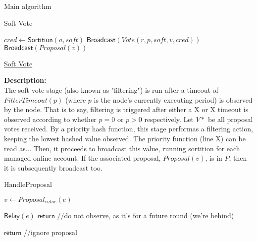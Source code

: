 \documentclass[10pt,a4paper]{article}
\begin{document}
\begin{section}{Main algorithm}
\begin{subsection}{Soft Vote}
\begin{algorithm}[H]
\begin{algorithmic}[1]
            \State $cred \gets \mathsf{Sortition}(a, soft)$
                \State $\mathsf{Broadcast}(Vote(r, p, soft, v, cred))$
                    \State $\mathsf{Broadcast}(Proposal(v))$
                \EndIf
            \EndIf
        \EndFor
    \EndIf

    \EndFunction
    \end{algorithmic}
    \caption{\underline{Soft Vote}}
\end{algorithm}

\noindent \textbf{Description:}\\
The soft vote stage (also known as "filtering") is run after a timeout of $FilterTimeout(p)$
(where $p$ is the node's currently executing period) is observed by the node. That is to say, filtering
is triggered after either a X or X timeout is observed according to whether $p=0$ or $p>0$ respectively.
Let $V*$ be all proposal votes received. By a priority hash function, this stage performas a filtering action,
keeping the lowest hashed value observed.
The priority function (line X) can be read as...
Then, it proceeds to broadcast this value, running sortition for each managed online account.
If the associated proposal, $Proposal(v)$, is in $P$, then it is subsequently broadcast too.

\end{subsection}


\begin{subsection}{HandleProposal}\label{ssect:HandleProposal}

    \begin{algorithm}[H]
        \begin{algorithmic}[1]

            \State $v \gets Proposal_{value}(e)$

                \State $\mathsf{Relay}(e)$
                \State $\mathsf{return}$  //do not observe, as it's for a future round (we're behind)
            \EndIf

                \State $\mathsf{return}$  //ignore proposal
            \EndIf


\end{algorithmic}
\end{algorithm}
\end{subsection}
\end{section}
\end{document}
